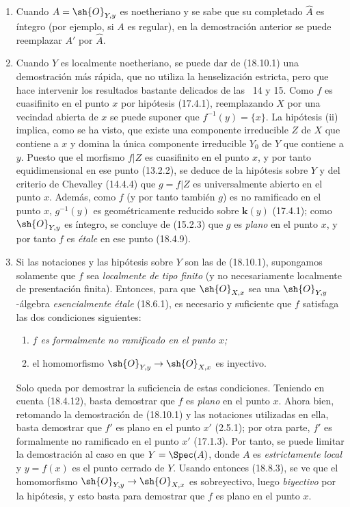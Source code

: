 \begin{remark}[18.10.2]
\label{IV.18.10.2}
\begin{enumerate}
  \item[(i)] Cuando $A=\sh{O}_{Y,y}$ es noetheriano y se sabe que su completado $\widehat A$ es íntegro (por ejemplo, si $A$ es regular), en la demostración anterior se puede reemplazar $A'$ por $\widehat A$.
  \item[(ii)] Cuando $Y$ es localmente noetheriano, se puede dar de (18.10.1) una demostración más rápida, que no utiliza la henselización estricta, pero que hace intervenir los resultados bastante delicados de las \textsection\textsection~14 y 15. Como $f$ es cuasifinito en el punto $x$ por hipótesis (17.4.1), reemplazando $X$ por una vecindad abierta de $x$ se puede suponer que $f^{-1}(y)=\{x\}$. La hipótesis (ii) implica, como se ha visto, que existe una componente irreducible $Z$ de $X$ que contiene a $x$ y domina la única componente irreducible $Y_0$ de $Y$ que contiene a $y$. Puesto que el morfismo $f|Z$ es cuasifinito en el punto $x$, y por tanto equidimensional en ese punto (13.2.2), se deduce de la hipótesis sobre $Y$ y del criterio de Chevalley (14.4.4) que $g=f|Z$ es universalmente abierto en el punto $x$. Además, como $f$ (y por tanto también $g$) es no ramificado en el punto $x$, $g^{-1}(y)$ es geométricamente reducido sobre $\boldsymbol{k}(y)$ (17.4.1); como $\sh{O}_{Y,y}$ es íntegro, se concluye de (15.2.3) que $g$ es \emph{plano} en el punto $x$, y por tanto $f$ es \emph{étale} en ese punto (18.4.9).
  \item[(iii)] Si las notaciones y las hipótesis sobre $Y$ son las de (18.10.1), supongamos solamente que $f$ sea \emph{localmente de tipo finito} (y no necesariamente localmente de presentación finita). Entonces, para que $\sh{O}_{X,x}$ sea una $\sh{O}_{Y,y}$-álgebra \emph{esencialmente étale} (18.6.1), es necesario y suficiente que $f$ satisfaga las dos condiciones siguientes:


\begin{enumerate}
  \item[$1^\circ$] \itshape $f$ es formalmente no ramificado en el punto $x$;
  \item[$2^\circ$] el homomorfismo $\sh{O}_{Y,y}\to\sh{O}_{X,x}$ es inyectivo.
\end{enumerate}

Solo queda por demostrar la suficiencia de estas condiciones. Teniendo en cuenta (18.4.12), basta demostrar que $f$ es \emph{plano} en el punto $x$. Ahora bien, retomando la demostración de (18.10.1) y las notaciones utilizadas en ella, basta demostrar que $f'$ es plano en el punto $x'$ (2.5.1); por otra parte, $f'$ es formalmente no ramificado en el punto $x'$ (17.1.3). Por tanto, se puede limitar la demostración al caso en que $Y=\Spec(A)$, donde $A$ es \emph{estrictamente local} y $y=f(x)$ es el punto cerrado de $Y$. Usando entonces (18.8.3), se ve que el homomorfismo $\sh{O}_{Y,y}\to\sh{O}_{X,x}$ es sobreyectivo, luego \emph{biyectivo} por la hipótesis, y esto basta para demostrar que $f$ es plano en el punto $x$.


\end{enumerate}
\end{remark}

